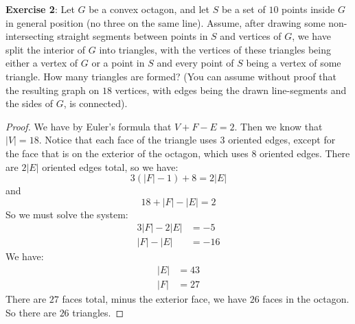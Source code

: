 \documentclass{article}
\begin{document}
\textbf{Exercise 2}: Let $G$ be a convex octagon, and let $S$ be a set of $10$ points inside $G$ in general position (no three on the same line). Assume, after drawing some non-intersecting straight segments between points in $S$ and vertices of $G$, we have split the interior of $G$ into triangles, with the vertices of these triangles being either a vertex of $G$ or a point in $S$ and every point of $S$ being a vertex of some triangle. How many triangles are formed? (You can assume without proof that the resulting graph on $18$ vertices, with edges being the drawn line-segments and the sides of $G$, is connected).
    \begin{proof}
        We have by Euler's formula that $V + F - E = 2$. Then we know that $\lvert V \rvert = 18$. Notice that each face of the triangle uses $3$ oriented edges, except for the face that is on the exterior of the octagon, which uses $8$ oriented edges. There are $2\lvert E \rvert$ oriented edges total, so we have:
            \begin{equation*}
                3(\lvert F \rvert - 1) + 8 = 2\lvert E \rvert
            \end{equation*}
        and
            \begin{equation*}
                18 + \lvert F \rvert - \lvert E \rvert = 2
            \end{equation*}
        So we must solve the system:
            \begin{align*}
                3\lvert F \rvert - 2\lvert E \rvert &= -5  \\
                \lvert F \rvert - \lvert E \rvert   &= -16   
            \end{align*}
        We have:
            \begin{align*}
                \lvert E \rvert  &= 43 \\
                \lvert F \rvert &= 27   
            \end{align*}
        There are $27$ faces total, minus the exterior face, we have $26$ faces in the octagon. So there are $26$ triangles.
    \end{proof}
\end{document}
